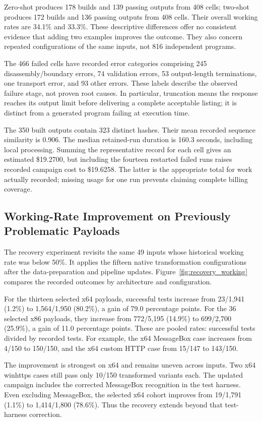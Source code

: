 Zero-shot produces 178 builds and 139 passing outputs from 408 cells;
two-shot produces 172 builds and 136 passing outputs from 408 cells.
Their overall working rates are 34.1\% and 33.3\%. These descriptive
differences offer no consistent evidence that adding two examples improves
the outcome. They also concern repeated configurations of the same inputs,
not 816 independent programs.

The 466 failed cells have recorded error categories comprising 245
disassembly/boundary errors, 74 validation errors, 53 output-length
terminations, one transport error, and 93 other errors. These labels
describe the observed failure stage, not proven root causes. In particular,
truncation means the response reaches its output limit before delivering
a complete acceptable listing; it is distinct from a generated program
failing at execution time.

The 350 built outputs contain 323 distinct hashes. Their mean recorded
sequence similarity is 0.906. The median retained-run duration is
160.3 seconds, including local processing. Summing the representative
record for each cell gives an estimated \$19.2700, but including the
fourteen restarted failed runs raises recorded campaign cost to
\$19.6258. The latter is the appropriate total for work actually recorded;
missing usage for one run prevents claiming complete billing coverage.

\subsection{Working-Rate Improvement on Previously Problematic Payloads}
\label{sec:recovery}
The recovery experiment revisits the same 49 inputs whose historical
working rate was below 50\%. It applies the fifteen native transformation
configurations after the data-preparation and pipeline updates.
Figure~\ref{fig:recovery_working} compares the recorded outcomes by
architecture and configuration.

For the thirteen selected x64 payloads, successful tests increase from
23/1,941 (1.2\%) to 1,564/1,950 (80.2\%), a gain of 79.0 percentage
points. For the 36 selected x86 payloads, they increase from 772/5,195
(14.9\%) to 699/2,700 (25.9\%), a gain of 11.0 percentage points.
These are pooled rates: successful tests divided by recorded tests.
For example, the x64 MessageBox case increases from 4/150 to 150/150,
and the x64 custom HTTP case from 15/147 to 143/150.

The improvement is strongest on x64 and remains uneven across inputs.
Two x64 winhttps cases still pass only 10/150 transformed variants each.
The updated campaign includes the corrected MessageBox recognition in the
test harness. Even excluding MessageBox, the selected x64 cohort improves
from 19/1,791 (1.1\%) to 1,414/1,800 (78.6\%). Thus the recovery extends
beyond that test-harness correction.

